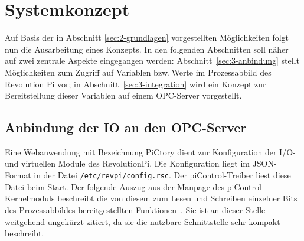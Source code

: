 % 
% 
% 
% 
% 
% 
% 
% 

\section{Systemkonzept%
  \label{sec:3-konzeption}}
Auf Basis der in Abschnitt \ref{sec:2-grundlagen} vorgestellten Möglichkeiten folgt nun die Ausarbeitung eines Konzepts.
In den folgenden Abschnitten soll näher auf zwei zentrale Aspekte eingegangen werden: Abschnitt~\ref{sec:3-anbindung} stellt Möglichkeiten zum Zugriff auf Variablen bzw.\,Werte im Prozessabbild des Revolution Pi vor; in Abschnitt~\ref{sec:3-integration} wird ein Konzept zur Bereitstellung dieser Variablen auf einem OPC-Server vorgestellt.

\subsection{Anbindung der IO an den OPC-Server%
     \label{sec:3-anbindung}}

Eine Webanwendung mit Bezeichnung PiCtory dient zur Konfiguration der I/O- und virtuellen Module des RevolutionPi. Die Konfiguration liegt im JSON-Format in der Datei \lstinline{/etc/revpi/config.rsc}. Der piControl-Treiber liest diese Datei beim Start. 
Der folgende Auszug aus der Manpage des piControl-Kernelmoduls beschreibt die von diesem zum Lesen und Schreiben einzelner Bits des Prozessabbildes bereitgestellten Funktionen~\citep[vgl.]{web-revpi-manpage}. Sie ist an dieser Stelle weitgehend ungekürzt zitiert, da sie die nutzbare Schnittstelle sehr kompakt beschreibt.

